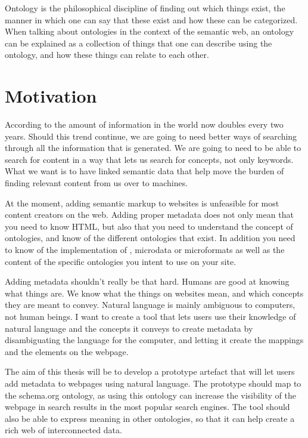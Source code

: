 Ontology is the philosophical discipline of finding out which things exist,
the manner in which one can say that these exist and how these can be categorized.
When talking about ontologies in the context of the semantic web,
an ontology can be explained as a collection of things that one can describe using the ontology,
and how these things can relate to each other.


\section{Motivation}
According to \citet{Gantz2011} the amount of information in the world now doubles every two years.
Should this trend continue, we are going to need better ways of searching through all the information that is generated.
We are going to need to be able to search for content in a way that lets us search for concepts, not only keywords.
What we want is to have linked semantic data that help move the burden of finding relevant content from us over to machines.

At the moment, adding semantic markup to websites is unfeasible for most content creators on the web.
Adding proper metadata does not only mean that you need to know HTML,
but also that you need to understand the concept of ontologies, and know of the different ontologies that exist.
In addition you need to know of the implementation of , microdata or microformats
as well as the content of the specific ontologies you intent to use on your site.

Adding metadata shouldn't really be that hard.
Humans are good at knowing what things are.
We know what the things on websites mean, and which concepts they are meant to convey.
Natural language is mainly ambiguous to computers, not human beings.
I want to create a tool that lets users use their knowledge of natural language and the concepts it conveys
to create metadata by disambiguating the language for the computer, and letting it create the mappings and the elements on the webpage.

The aim of this thesis will be to develop a prototype artefact that will let users add metadata to webpages using natural language.
The prototype should map to the schema.org ontology,
as using this ontology can increase the visibility of the webpage in search results in the most popular search engines.
The tool should also be able to express meaning in other ontologies, so that it can help create a rich web of interconnected data.

